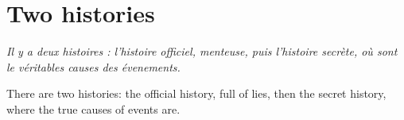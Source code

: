 \section{Two histories}

\begin{quotex}
\textit{Il y a deux histoires : l'histoire officiel, menteuse, puis l'histoire secrète, où sont le véritables causes des évenements.}
\end{quotex}


\begin{quotex}
There are two histories: the official history, full of lies, then the secret history, where the true causes of events are.
\end{quotex}






